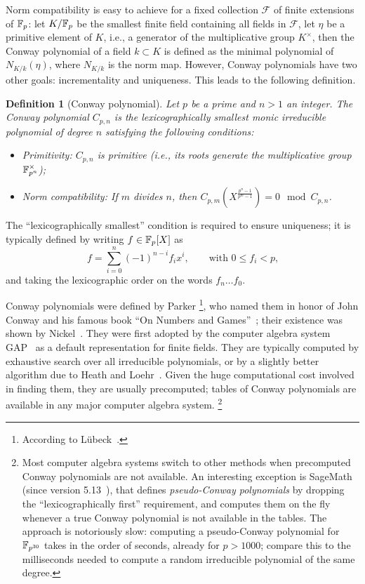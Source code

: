 \documentclass{sig-alternate}
\newtheorem{definition}{Definition}
\begin{document}
Norm compatibility is easy to achieve for a fixed collection
$\mathcal{F}$ of finite extensions of $\mathbb{F}_p$: let $K/\mathbb{F}_p$ be the
smallest finite field containing all fields in $\mathcal{F}$, let
$\eta$ be a primitive element of $K$, i.e., a generator of the
multiplicative group $K^\times$, then the Conway polynomial of a field
$k\subset K$ is defined as the minimal polynomial of $N_{K/k}(\eta)$,
where $N_{K/k}$ is the norm map. %
However, Conway polynomials have two other goals: incrementality and
uniqueness. %
This leads to the following definition.

\begin{definition}[Conway polynomial]
  Let $p$ be a prime and $n>1$ an integer. %
  The \emph{Conway polynomial} $C_{p,n}$ is the
  \emph{lexicographically smallest} monic irreducible polynomial of
  degree $n$ satisfying the following conditions:
  \begin{itemize}
  \item \emph{Primitivity:} $C_{p,n}$ is primitive (i.e., its roots
    generate the multiplicative group $\mathbb{F}_{p^n}^\times$);
  \item \emph{Norm compatibility:} If $m$ divides $n$, then
    $C_{p,m}\left(X^{\frac{p^n-1}{p^m-1}}\right) = 0 \mod C_{p,n}$.
  \end{itemize}
\end{definition}

The ``lexicographically smallest'' condition is required to ensure
uniqueness; it is typically defined by writing $f\in\mathbb{F}_p[X]$ as
\begin{equation*}
  f = \sum_{i=0}^n (-1)^{n-i} f_i x^i,
  \qquad\text{with $0\le f_i<p$,}
\end{equation*}
and taking the lexicographic order on the words $f_n\dots f_0$.

Conway polynomials were defined by Parker%
\footnote{According to Lübeck~\cite{Luebeck}.}, %
who named them in honor of John Conway and his famous book ``On
Numbers and Games''~\cite{Conway:ONAG2000}; their existence was shown
by Nickel~\cite{Nickel1988}. %
They were first adopted by the computer algebra system GAP~\cite{GAP4}
as a default representation for finite fields. %
They are typically computed by exhaustive search over all irreducible
polynomials, or by a slightly better algorithm due to Heath and
Loehr~\cite{heath+loehr99}. %
Given the huge computational cost involved in finding them, they are
usually precomputed; tables of Conway polynomials are available in any
major computer algebra system.%
\footnote{Most computer algebra systems switch to other methods when
  precomputed Conway polynomials are not available. %
  An interesting exception is SageMath (since version
  5.13~\cite{Roe2013}), that defines \emph{pseudo-Conway polynomials}
  by dropping the ``lexicographically first'' requirement, and
  computes them on the fly whenever a true Conway polynomial is not
  available in the tables. %
  The approach is notoriously slow: computing a pseudo-Conway
  polynomial for $\mathbb{F}_{p^{30}}$ takes in the order of seconds, already
  for $p>1000$; compare this to the milliseconds needed to compute a
  random irreducible polynomial of the same degree.} %
\end{document}
